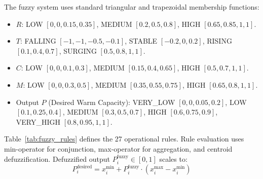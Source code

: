 \documentclass[final,5p,times,twocolumn]{elsarticle}
\begin{document}
The fuzzy system uses standard triangular and trapezoidal membership functions:
\begin{itemize}[leftmargin=*]
    \item $R$: LOW $[0, 0, 0.15, 0.35]$, MEDIUM $[0.2, 0.5, 0.8]$, HIGH $[0.65, 0.85, 1, 1]$.
    \item $T$: FALLING $[-1, -1, -0.5, -0.1]$, STABLE $[-0.2, 0, 0.2]$, RISING $[0.1, 0.4, 0.7]$, SURGING $[0.5, 0.8, 1, 1]$.
    \item $C$: LOW $[0, 0, 0.1, 0.3]$, MEDIUM $[0.15, 0.4, 0.65]$, HIGH $[0.5, 0.7, 1, 1]$.
    \item $M$: LOW $[0, 0, 0.3, 0.5]$, MEDIUM $[0.35, 0.55, 0.75]$, HIGH $[0.65, 0.8, 1, 1]$.
    \item Output $P$ (Desired Warm Capacity): VERY\_LOW $[0, 0, 0.05, 0.2]$, LOW $[0.1, 0.25, 0.4]$, MEDIUM $[0.3, 0.5, 0.7]$, HIGH $[0.6, 0.75, 0.9]$, VERY\_HIGH $[0.8, 0.95, 1, 1]$.
\end{itemize}

Table~\ref{tab:fuzzy_rules} defines the 27 operational rules. Rule evaluation uses min-operator for conjunction, max-operator for aggregation, and centroid defuzzification. Defuzzified output $P_i^{\text{fuzzy}} \in [0, 1]$ scales to:
\begin{equation}
P_i^{\text{desired}} = x_i^{\min} + P_i^{\text{fuzzy}} \cdot (x_i^{\max} - x_i^{\min})
\end{equation}
\end{document}
